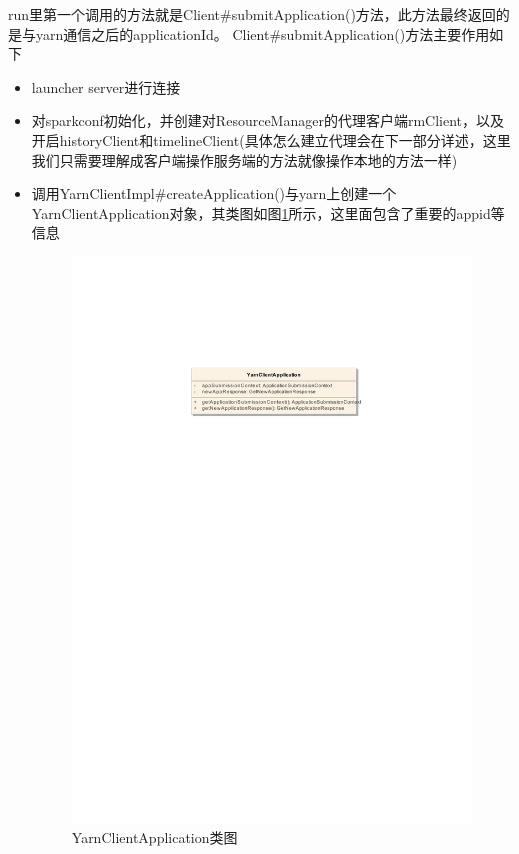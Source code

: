 run里第一个调用的方法就是Client\#submitApplication()方法，此方法最终返回的是与yarn通信之后的applicationId。
Client\#submitApplication()方法主要作用如下
\begin{itemize}
	\item launcher server进行连接
	\item   对sparkconf初始化，并创建对ResourceManager的代理客户端rmClient，以及开启historyClient和timelineClient(具体怎么建立代理会在下一部分详述，这里我们只需要理解成客户端操作服务端的方法就像操作本地的方法一样)
	\item 调用YarnClientImpl\#createApplication()与yarn上创建一个YarnClientApplication对象，其类图如图\ref{YarnClientApplication}所示，这里面包含了重要的appid等信息
		\begin{figure}[H] 
		\centering
		\includegraphics{figures/YarnClientApplication.pdf}
		\caption{YarnClientApplication类图}
		\label{YarnClientApplication}

\end{figure}
\end{itemize}
